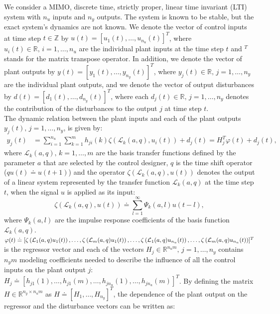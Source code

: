 \documentclass[10 pt, letterpaper]{article}
\newcommand{\beq}{\begin{equation}}
\newcommand{\eeq}{\end{equation}}
\newcommand{\bR}{{\mathbb R}}
\newcommand{\bZ}{{\mathbb Z}}
\begin{document}
We consider a MIMO, discrete time, strictly proper, linear time invariant (LTI) system with $n_u$ inputs and $n_y$ outputs. The system is known to be stable, but the exact system's dynamics are not known. We denote the vector of control inputs at time step $t\in \bZ$ by $u(t)=[u_1(t),\hdots,u_{n_u}(t)]^T$, where $u_i(t)\in \bR,\,i=1,\hdots,n_u$ are the individual plant inputs at the time step $t$ and $^T$ stands for the matrix transpose operator. In addition, we denote the vector of plant outputs by $y(t)=[y_1(t),\hdots,y_{n_y}(t)]^T$, where $y_j(t)\in \bR ,\, j=1,\hdots, n_y$ are the individual plant outputs, and we denote the vector of output disturbances by $d(t)=[d_1(t),\hdots,d_{n_y}(t)]^T$, where each $d_j(t)\in \bR, \, j=1,\hdots,n_y$ denotes the contribution of the disturbances to the output $j$ at time step $t$.\\
The dynamic relation between the plant inputs and each of the plant outputs $y_j(t),\, j=1,\hdots,n_y$, is given by:
\beq\label{Eq:plant_output}
\begin{aligned}
y_j(t)&=\sum\limits_{i=1}^{n_u}\sum\limits_{k=1}^{m}h_{ji}(k)\zeta\left(\mathcal{L}_k(a,q),u_i(t)\right)+d_j(t)= H_j^T\varphi(t)+d_j(t),
\end{aligned}
\eeq
where $\mathcal{L}_k(a,q),\, k=1,\hdots, m$ are the basis transfer functions defined by the parameter $a$ that are selected by the control designer, $q$ is the time shift operator ($qu(t)\doteq u(t+1)$) and the operator $\zeta\left(\mathcal{L}_k(a,q),u(t)\right)$ denotes the output of a linear system represented by the transfer function $\mathcal{L}_k(a,q)$ at the time step $t$, when the signal $u$ is applied as its input:
\beq\label{Eq:operator}
\zeta\left(\mathcal{L}_k(a,q),u(t)\right)\doteq \sum\limits_{l=1}^{\infty}\Psi_k(a,l)u(t-l),
\eeq
where $\Psi_k(a,l)$ are the impulse response coefficients of the basis function $\mathcal{L}_k(a,q)$. $\varphi(t)\doteq [\zeta\left(\mathcal{L}_1(a,q)u_1(t)\right), \hdots,\\\zeta\left(\mathcal{L}_m(a,q)u_1(t)\right),\hdots, \zeta\left(\mathcal{L}_1(a,q)u_{n_u}(t)\right), \hdots, \zeta\left(\mathcal{L}_m(a,q)u_{n_u}(t)\right)]^T$ is the regressor vector and each of the vectors $H_j\in \bR^{n_um},\, j=1,\hdots, n_y$ contains $n_ym$ modeling coefficients needed to describe the influence of all the control inputs on the plant output $j$: $H_j\doteq[h_{j1}(1), \hdots, h_{j1}(m), \hdots, h_{jn_u}(1), \hdots, h_{jn_u}(m)]^T$. By defining the matrix $H\in \bR^{n_y\times n_um}$ as $H \doteq \left[H_1, \hdots, H_{n_y}\right]^T$, the dependence of the plant output on the regressor and the disturbance vectors can be written as:
\end{document}
